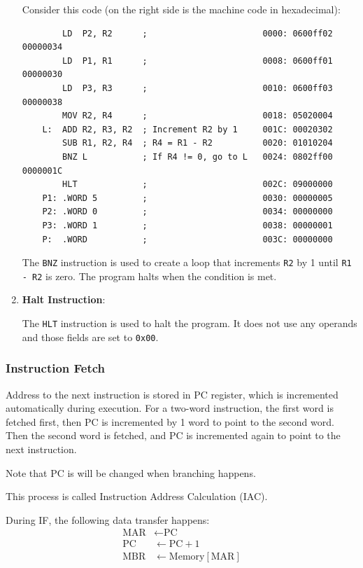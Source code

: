 \begin{enumerate}
\begin{example}
    Consider this code (on the right side is the machine code in hexadecimal):
    \begin{verbatim}
        LD  P2, R2      ;                       0000: 0600ff02 00000034
        LD  P1, R1      ;                       0008: 0600ff01 00000030
        LD  P3, R3      ;                       0010: 0600ff03 00000038
        MOV R2, R4      ;                       0018: 05020004
    L:  ADD R2, R3, R2  ; Increment R2 by 1     001C: 00020302
        SUB R1, R2, R4  ; R4 = R1 - R2          0020: 01010204
        BNZ L           ; If R4 != 0, go to L   0024: 0802ff00 0000001C
        HLT             ;                       002C: 09000000 
    P1: .WORD 5         ;                       0030: 00000005
    P2: .WORD 0         ;                       0034: 00000000
    P3: .WORD 1         ;                       0038: 00000001
    P:  .WORD           ;                       003C: 00000000
    \end{verbatim}
    The \texttt{BNZ} instruction is used to create a loop that increments \texttt{R2} by 1
    until \texttt{R1 - R2} is zero. The program halts when the condition is met.
\end{example}

\item \textbf{Halt Instruction}:

The \texttt{HLT} instruction is used to halt the program. It does not use any operands
and those fields are set to \texttt{0x00}.

\end{enumerate}

\subsubsection{Instruction Fetch}

Address to the next instruction is stored in PC register, which is incremented automatically
during execution. For a two-word instruction, the first word is fetched first, then PC
is incremented by 1 word to point to the second word. Then the second word is fetched,
and PC is incremented again to point to the next instruction.

Note that PC is will be changed when branching happens.

This process is called Instruction Address Calculation (IAC).

During IF, the following data transfer happens:
\begin{align*}
    \text{MAR} &\leftarrow \text{PC} \\
    \text{PC} &\leftarrow \text{PC} + 1 \\
    \text{MBR} &\leftarrow \text{Memory}[\text{MAR}]
\end{align*}


